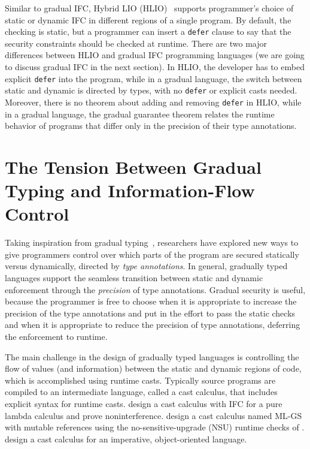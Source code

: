 \documentclass[10pt, letterpaper]{article}
\begin{document}
Similar to gradual IFC, Hybrid LIO (HLIO)~\cite{Buiras:2015aa} supports
programmer's choice of static or dynamic IFC in different regions of a single
program. By default, the checking is static, but a programmer can insert a
\texttt{defer} clause to say that the security constraints should be checked at
runtime. There are two major differences between HLIO and gradual IFC
programming languages (we are going to discuss gradual IFC in the next section).
In HLIO, the developer has to embed explicit \texttt{defer} into the program,
while in a gradual language, the switch between static and dynamic is directed
by types, with no \texttt{defer} or explicit casts needed. Moreover, there is no
theorem about adding and removing \texttt{defer} in HLIO, while in a gradual
language, the gradual guarantee theorem relates the runtime behavior of programs
that differ only in the precision of their type annotations.

\section{The Tension Between Gradual Typing and Information-Flow Control}
\label{sec:intro-gradual-ifc}

Taking inspiration from gradual typing~\citep{Siek:2006bh,Siek:2007qy},
researchers have explored new ways to give programmers control over which parts
of the program are secured statically versus dynamically, directed by
\textit{type annotations}. In general, gradually typed languages support the
seamless transition between static and dynamic enforcement through the
\textit{precision} of type annotations. Gradual security is useful, because the
programmer is free to choose when it is appropriate to increase the precision of
the type annotations and put in the effort to pass the static checks and when it
is appropriate to reduce the precision of type annotations, deferring the
enforcement to runtime.

The main challenge in the design of gradually typed languages is controlling the
flow of values (and information) between the static and dynamic regions of code,
which is accomplished using runtime casts. Typically source programs are
compiled to an intermediate language, called a cast calculus, that includes
explicit syntax for runtime casts. \citet{Disney:2011fv} design a cast
calculus with IFC for a pure lambda calculus and prove noninterference.
\citet{Fennell:2013ab} design a cast calculus named ML-GS with mutable
references using the no-sensitive-upgrade (NSU) runtime checks of
\citet{austin2009efficient}. \citet{Fennell:2015aa} design a cast calculus
for an imperative, object-oriented language.
\end{document}

